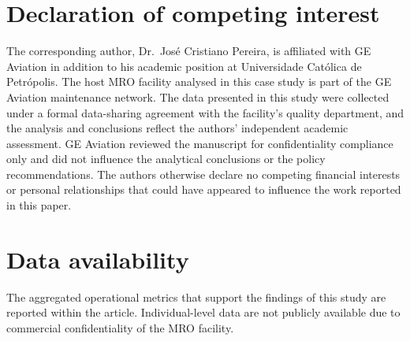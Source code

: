 \documentclass[a4paper,fleqn,oneside]{cas-dc}
\newcommand{\MRO}{MRO\xspace}
\begin{document}
\section*{Declaration of competing interest}
The corresponding author, Dr.\ Jos\'e Cristiano Pereira, is affiliated
with GE Aviation in addition to his academic position at Universidade
Cat\'olica de Petr\'opolis.
The host \MRO{} facility analysed in this case study is part of the GE
Aviation maintenance network. The data presented in this study were collected
under a formal data-sharing agreement with the facility's quality
department, and the analysis and conclusions reflect the authors'
independent academic assessment. GE Aviation reviewed the manuscript
for confidentiality compliance only and did not influence the analytical
conclusions or the policy recommendations. The authors otherwise declare
no competing financial interests or personal relationships that could
have appeared to influence the work reported in this paper.

\section*{Data availability}
The aggregated operational metrics that support the findings of this study
are reported within the article. Individual-level data are not publicly
available due to commercial confidentiality of the \MRO{} facility.

\printcredits



\end{document}

